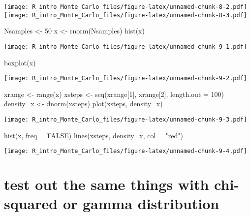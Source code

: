 \documentclass[
]{article}
\newenvironment{Shaded}{\begin{snugshade}}{\end{snugshade}}
\newcommand{\AttributeTok}[1]{\textcolor[rgb]{0.77,0.63,0.00}{#1}}
\newcommand{\ConstantTok}[1]{\textcolor[rgb]{0.00,0.00,0.00}{#1}}
\newcommand{\DecValTok}[1]{\textcolor[rgb]{0.00,0.00,0.81}{#1}}
\newcommand{\FunctionTok}[1]{\textcolor[rgb]{0.00,0.00,0.00}{#1}}
\newcommand{\NormalTok}[1]{#1}
\newcommand{\OtherTok}[1]{\textcolor[rgb]{0.56,0.35,0.01}{#1}}
\newcommand{\StringTok}[1]{\textcolor[rgb]{0.31,0.60,0.02}{#1}}
\begin{document}
\texttt{[image: R\_intro\_Monte\_Carlo\_files/figure-latex/unnamed-chunk-8-2.pdf]}
\texttt{[image: R\_intro\_Monte\_Carlo\_files/figure-latex/unnamed-chunk-8-3.pdf]}

\begin{Shaded}
\begin{Highlighting}[]
\NormalTok{Nsamples }\OtherTok{\textless{}{-}} \DecValTok{50}
\NormalTok{x }\OtherTok{\textless{}{-}} \FunctionTok{rnorm}\NormalTok{(Nsamples)}
\FunctionTok{hist}\NormalTok{(x)}
\end{Highlighting}
\end{Shaded}

\texttt{[image: R\_intro\_Monte\_Carlo\_files/figure-latex/unnamed-chunk-9-1.pdf]}

\begin{Shaded}
\begin{Highlighting}[]
\FunctionTok{boxplot}\NormalTok{(x)}
\end{Highlighting}
\end{Shaded}

\texttt{[image: R\_intro\_Monte\_Carlo\_files/figure-latex/unnamed-chunk-9-2.pdf]}

\begin{Shaded}
\begin{Highlighting}[]
\NormalTok{xrange }\OtherTok{\textless{}{-}} \FunctionTok{range}\NormalTok{(x)}
\NormalTok{xsteps }\OtherTok{\textless{}{-}} \FunctionTok{seq}\NormalTok{(xrange[}\DecValTok{1}\NormalTok{], xrange[}\DecValTok{2}\NormalTok{], }\AttributeTok{length.out =} \DecValTok{100}\NormalTok{)}
\NormalTok{density\_x }\OtherTok{\textless{}{-}} \FunctionTok{dnorm}\NormalTok{(xsteps)}
\FunctionTok{plot}\NormalTok{(xsteps, density\_x)}
\end{Highlighting}
\end{Shaded}

\texttt{[image: R\_intro\_Monte\_Carlo\_files/figure-latex/unnamed-chunk-9-3.pdf]}

\begin{Shaded}
\begin{Highlighting}[]
\FunctionTok{hist}\NormalTok{(x, }\AttributeTok{freq =} \ConstantTok{FALSE}\NormalTok{)}
\FunctionTok{lines}\NormalTok{(xsteps, density\_x, }\AttributeTok{col =} \StringTok{"red"}\NormalTok{)}
\end{Highlighting}
\end{Shaded}

\texttt{[image: R\_intro\_Monte\_Carlo\_files/figure-latex/unnamed-chunk-9-4.pdf]}

\hypertarget{test-out-the-same-things-with-chi-squared-or-gamma-distribution}{%
\section{test out the same things with chi-squared or gamma
distribution}\label{test-out-the-same-things-with-chi-squared-or-gamma-distribution}}
\end{document}
